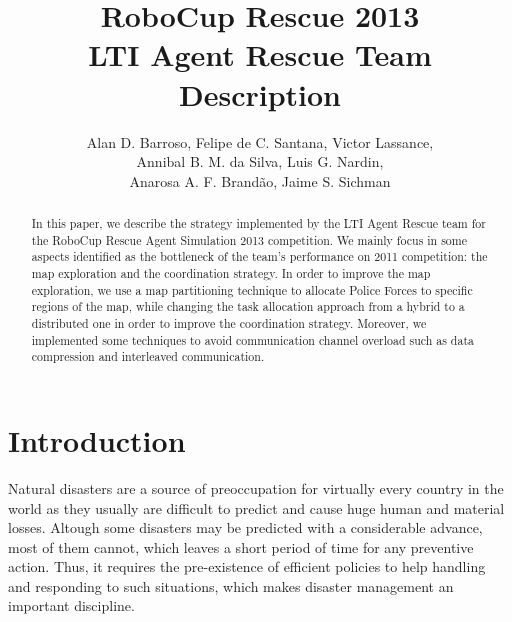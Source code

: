 \documentclass{llncs}
\begin{document}
\title{RoboCup Rescue 2013\\
       LTI Agent Rescue Team Description}
\author{Alan D. Barroso, Felipe de C. Santana, Victor Lassance,\\
		Annibal B. M. da Silva, Luis G. Nardin,\\
        Anarosa A. F. Brandão, Jaime S. Sichman}
\maketitle
\begin{abstract}
In this paper, we describe the strategy implemented by the LTI Agent Rescue team for the RoboCup Rescue Agent Simulation 2013 competition. We mainly focus in some aspects identified as the bottleneck of the team's performance on 2011 competition: the map exploration and the coordination strategy. In order to improve the map exploration, we use a map partitioning technique to allocate Police Forces to specific regions of the map, while changing the task allocation approach from a hybrid to a distributed one in order to improve the coordination strategy. Moreover, we implemented some techniques to avoid communication channel overload such as data compression and interleaved communication.
\end{abstract}
\section{Introduction}
\label{sec:introduction}
Natural disasters are a source of preoccupation for virtually every country in the world as they usually are difficult to predict and cause huge human and material losses. Altough some disasters may be predicted with a considerable advance, most of them cannot, which leaves a short period of time for any preventive action. Thus, it requires the pre-existence of efficient policies to help handling and responding to such situations, which makes disaster management an important discipline. 
\end{document}
